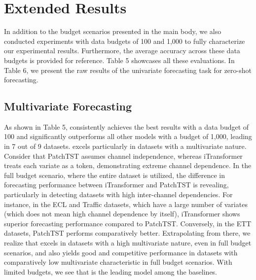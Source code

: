 \newpage
\section{Extended Results}




In addition to the budget scenarios presented in the main body, we also conducted experiments with data budgets of 100 and 1,000 to fully characterize our experimental results. Furthermore, the average accuracy across these data budgets is provided for reference. Table 5 showcases all these evaluations. In Table 6, we present the raw results of the univariate forecasting task for zero-shot forecasting.

\subsection{Multivariate Forecasting}
As shown in Table 5, \name consistently achieves the best results with a data budget of 100 and significantly outperforms all other models with a budget of 1,000, leading in 7 out of 9 datasets. \name excels particularly in datasets with a multivariate nature. Consider that PatchTST \cite{Yuqietal-2023-PatchTST} assumes channel independence, whereas iTransformer \cite{liu2023itransformer} treats each variate as a token, demonstrating extreme channel dependence. In the full budget scenario, where the entire dataset is utilized, the difference in forecasting performance between iTransformer and PatchTST is revealing, particularly in detecting datasets with high inter-channel dependencies. For instance, in the ECL and Traffic datasets, which have a large number of variates (which does not mean high channel dependence by itself), iTransformer shows superior forecasting performance compared to PatchTST. Conversely, in the ETT datasets, PatchTST performs comparatively better. Extrapolating from there, we realize that \name excels in datasets with a high multivariate nature, even in full budget scenarios, and also yields good and competitive performance in datasets with comparatively low multivariate characteristic in full budget scenarios. With limited budgets, we see that \name is the leading model among the baselines.  

